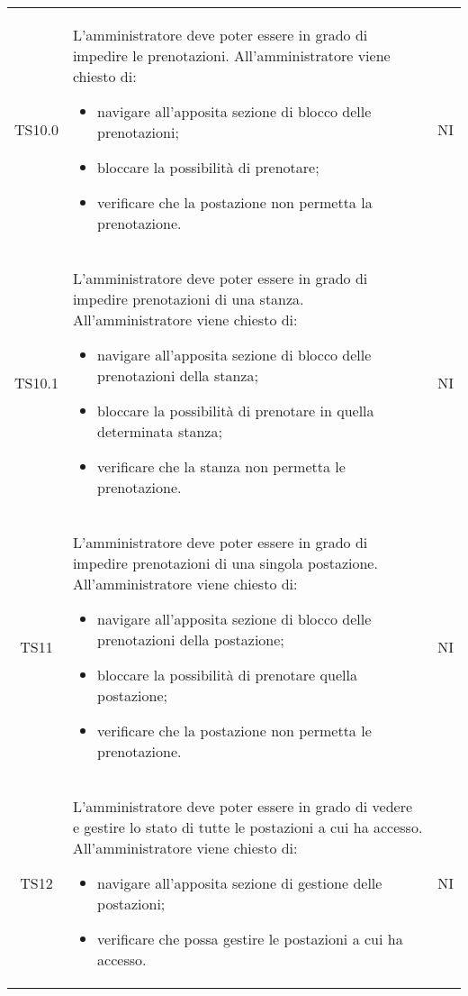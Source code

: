 {\begin{longtable}{ c C{11cm} c }
        TS10.0&
        L'amministratore deve poter essere in grado di impedire le prenotazioni.\newline
        All'amministratore viene chiesto di:
        \begin{itemize}
            \item navigare all'apposita sezione di blocco delle prenotazioni;
            \item bloccare la possibilità di prenotare;
            \item verificare che la postazione non permetta la prenotazione.
        \end{itemize}&
        NI\\

        TS10.1&
        L'amministratore deve poter essere in grado di impedire prenotazioni di una stanza.\newline
        All'amministratore viene chiesto di:
        \begin{itemize}
            \item navigare all'apposita sezione di blocco delle prenotazioni della stanza;
            \item bloccare la possibilità di prenotare in quella determinata stanza;
            \item verificare che la stanza non permetta le prenotazione.
        \end{itemize}&
        NI\\

        TS11&
        L'amministratore deve poter essere in grado di impedire prenotazioni di una singola postazione.\newline
        All'amministratore viene chiesto di:
        \begin{itemize}
            \item navigare all'apposita sezione di blocco delle prenotazioni della postazione;
            \item bloccare la possibilità di prenotare quella postazione;
            \item verificare che la postazione non permetta le prenotazione.
        \end{itemize}&
        NI\\

        TS12&
        L'amministratore deve poter essere in grado di vedere e gestire lo stato di tutte le postazioni a cui ha accesso.\newline
        All'amministratore viene chiesto di:
        \begin{itemize}
            \item navigare all'apposita sezione di gestione delle postazioni;
            \item verificare che possa gestire le postazioni a cui ha accesso.
        \end{itemize}&
        NI\\


\end{longtable}}
